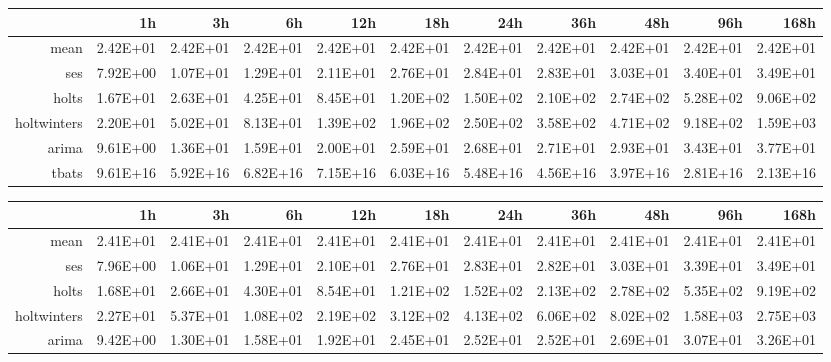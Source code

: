 \begin{landscape}
\begin{table}[ht]
\centering
\begin{tabular}{rrrrrrrrrrr}
  \hline
 & 1h & 3h & 6h & 12h & 18h & 24h & 36h & 48h & 96h & 168h \\ 
  \hline
mean & 2.42E+01 & 2.42E+01 & 2.42E+01 & 2.42E+01 & 2.42E+01 & 2.42E+01 & 2.42E+01 & 2.42E+01 & 2.42E+01 & 2.42E+01 \\ 
  ses & 7.92E+00 & 1.07E+01 & 1.29E+01 & 2.11E+01 & 2.76E+01 & 2.84E+01 & 2.83E+01 & 3.03E+01 & 3.40E+01 & 3.49E+01 \\ 
  holts & 1.67E+01 & 2.63E+01 & 4.25E+01 & 8.45E+01 & 1.20E+02 & 1.50E+02 & 2.10E+02 & 2.74E+02 & 5.28E+02 & 9.06E+02 \\ 
  holtwinters & 2.20E+01 & 5.02E+01 & 8.13E+01 & 1.39E+02 & 1.96E+02 & 2.50E+02 & 3.58E+02 & 4.71E+02 & 9.18E+02 & 1.59E+03 \\ 
  arima & 9.61E+00 & 1.36E+01 & 1.59E+01 & 2.00E+01 & 2.59E+01 & 2.68E+01 & 2.71E+01 & 2.93E+01 & 3.43E+01 & 3.77E+01 \\ 
  tbats & 9.61E+16 & 5.92E+16 & 6.82E+16 & 7.15E+16 & 6.03E+16 & 5.48E+16 & 4.56E+16 & 3.97E+16 & 2.81E+16 & 2.13E+16 \\ 
   \hline
\end{tabular}
\end{table}
\begin{table}[ht]
\centering
\begin{tabular}{rrrrrrrrrrr}
  \hline
 & 1h & 3h & 6h & 12h & 18h & 24h & 36h & 48h & 96h & 168h \\ 
  \hline
mean & 2.41E+01 & 2.41E+01 & 2.41E+01 & 2.41E+01 & 2.41E+01 & 2.41E+01 & 2.41E+01 & 2.41E+01 & 2.41E+01 & 2.41E+01 \\ 
  ses & 7.96E+00 & 1.06E+01 & 1.29E+01 & 2.10E+01 & 2.76E+01 & 2.83E+01 & 2.82E+01 & 3.03E+01 & 3.39E+01 & 3.49E+01 \\ 
  holts & 1.68E+01 & 2.66E+01 & 4.30E+01 & 8.54E+01 & 1.21E+02 & 1.52E+02 & 2.13E+02 & 2.78E+02 & 5.35E+02 & 9.19E+02 \\ 
  holtwinters & 2.27E+01 & 5.37E+01 & 1.08E+02 & 2.19E+02 & 3.12E+02 & 4.13E+02 & 6.06E+02 & 8.02E+02 & 1.58E+03 & 2.75E+03 \\ 
  arima & 9.42E+00 & 1.30E+01 & 1.58E+01 & 1.92E+01 & 2.45E+01 & 2.52E+01 & 2.52E+01 & 2.69E+01 & 3.07E+01 & 3.26E+01 \\ 

\end{tabular}
\end{table}
\end{landscape}
